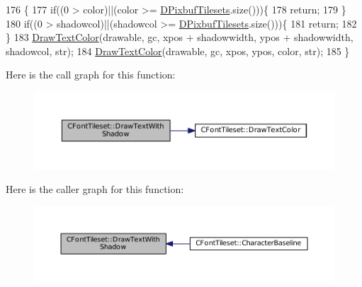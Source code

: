 \begin{DoxyCode}
176                                                                                                            
                                                       \{
177     \textcolor{keywordflow}{if}((0 > color)||(color >= \hyperlink{classCFontTileset_ae6e92dd613809fb15892b51e0e6b4940}{DPixbufTilesets}.size()))\{
178         \textcolor{keywordflow}{return};    
179     \}
180     \textcolor{keywordflow}{if}((0 > shadowcol)||(shadowcol >= \hyperlink{classCFontTileset_ae6e92dd613809fb15892b51e0e6b4940}{DPixbufTilesets}.size()))\{
181         \textcolor{keywordflow}{return};    
182     \}
183     \hyperlink{classCFontTileset_a987f13f64865891b7bf8b10f0b519fb7}{DrawTextColor}(drawable, gc, xpos + shadowwidth, ypos + shadowwidth, shadowcol, str);
184     \hyperlink{classCFontTileset_a987f13f64865891b7bf8b10f0b519fb7}{DrawTextColor}(drawable, gc, xpos, ypos, color, str);
185 \}
\end{DoxyCode}
Here is the call graph for this function\+:\nopagebreak
\begin{figure}[H]
\begin{center}
\leavevmode
\includegraphics[width=350pt]{classCFontTileset_a6716e51a5692130847914287a5f1b734_cgraph}
\end{center}
\end{figure}
Here is the caller graph for this function\+:\nopagebreak
\begin{figure}[H]
\begin{center}
\leavevmode
\includegraphics[width=350pt]{classCFontTileset_a6716e51a5692130847914287a5f1b734_icgraph}
\end{center}
\end{figure}
\hypertarget{classCFontTileset_a9564525bf20b3b5b6941e5f86827eb5d}{}\label{classCFontTileset_a9564525bf20b3b5b6941e5f86827eb5d} 
